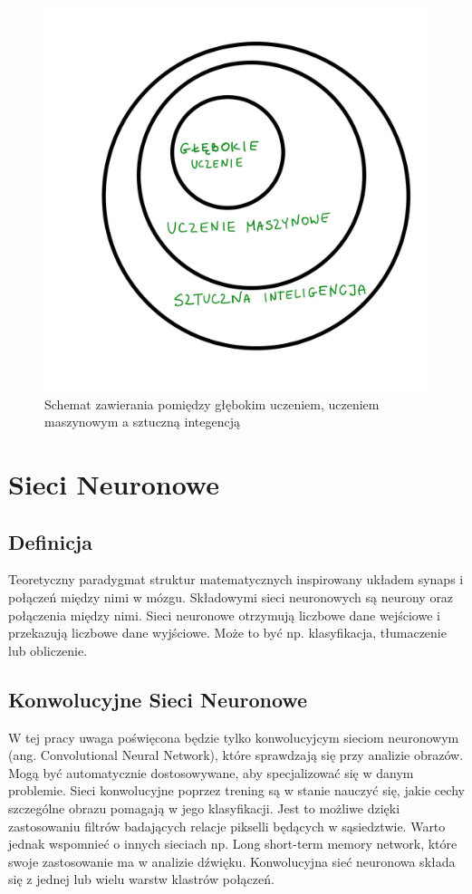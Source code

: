 \documentclass[brudnopis]{xmgr}
\begin{document}
\begin{figure}[!tbh]
\centering
\includegraphics[width=.8\hsize]{fig/1}
\caption{Schemat zawierania pomiędzy głębokim uczeniem, uczeniem maszynowym a sztuczną integencją\label{RYS.1}}
\end{figure}


\chapter{Sieci Neuronowe  }

\section{Definicja\label{s:dsssl}}

Teoretyczny paradygmat struktur matematycznych inspirowany układem synaps i połączeń między nimi w mózgu. Składowymi sieci neuronowych są neurony oraz połączenia między nimi. Sieci neuronowe otrzymują liczbowe dane wejściowe i przekazują liczbowe dane wyjściowe. Może to być np. klasyfikacja, tłumaczenie lub obliczenie.


\section{Konwolucyjne Sieci Neuronowe  \label{s:dsssl}}
W tej pracy uwaga poświęcona będzie tylko konwolucyjcym sieciom neuronowym (ang. Convolutional Neural Network), które sprawdzają się przy analizie obrazów.  
Mogą być automatycznie dostosowywane, aby specjalizować się w danym problemie.
Sieci konwolucyjne poprzez trening są w stanie nauczyć się, jakie cechy szczególne obrazu pomagają w jego klasyfikacji. Jest to możliwe dzięki zastosowaniu filtrów badających relacje pikselli będących w sąsiedztwie. Warto jednak wspomnieć o innych sieciach np. Long short-term memory network, które swoje zastosowanie ma w analizie dźwięku. Konwolucyjna sieć neuronowa składa się z jednej lub wielu warstw klastrów połączeń.
\end{document}
